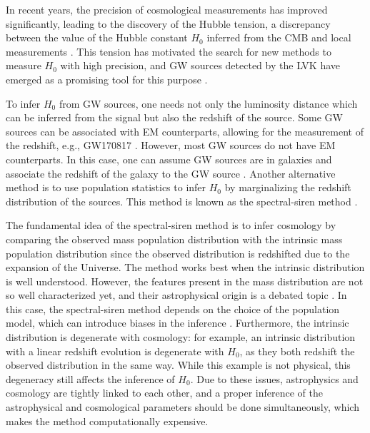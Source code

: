 \documentclass[sn-aps, pdflatex, iicol]{sn-jnl}
\begin{document}
In recent years, the precision of cosmological measurements has improved significantly, leading to the discovery of the Hubble tension, a discrepancy between the value of the Hubble constant $H_0$ inferred from the \ac{CMB} \citep{Planck:2018vyg} and local measurements \citep{Riess:2021jrx}.
This tension has motivated the search for new methods to measure $H_0$ with high precision, and \ac{GW} sources detected by the \ac{LVK} \citep{KAGRA:2013rdx, LIGOScientific:2014pky, VIRGO:2014yos, KAGRA:2020tym} have emerged as a promising tool for this purpose \citep{LIGOScientific:2017adf, LIGOScientific:2021aug, Ezquiaga:2022zkx}.

To infer $H_0$ from \ac{GW} sources, one needs not only the luminosity distance which can be inferred from the signal but also the redshift of the source.
Some \ac{GW} sources can be associated with \ac{EM} counterparts, allowing for the measurement of the redshift, e.g., GW170817 \citep{LIGOScientific:2017adf, Guidorzi:2017ogy}.
However, most \ac{GW} sources do not have \ac{EM} counterparts.
In this case, one can assume \ac{GW} sources are in galaxies and associate the redshift of the galaxy to the \ac{GW} source \citep{Schutz:1986gp, DelPozzo:2011vcw, Gray:2019ksv, Gray:2023wgj}.
Another alternative method is to use population statistics to infer $H_0$ by marginalizing the redshift distribution of the sources.
This method is known as the spectral-siren method \citep{Farr:2019twy, You:2020wju, Mastrogiovanni:2021wsd, LIGOScientific:2021aug, Ezquiaga:2022zkx}.

The fundamental idea of the spectral-siren method is to infer cosmology by comparing the observed mass population distribution with the intrinsic mass population distribution since the observed distribution is redshifted due to the expansion of the Universe.
The method works best when the intrinsic distribution is well understood.
However, the features present in the mass distribution are not so well characterized yet, and their astrophysical origin is a debated topic \citep{Zevin:2017evb, Mapelli:2020vfa, Zevin:2020gbd, Mandel:2018hfr, Marchant:2023wno}.
In this case, the spectral-siren method depends on the choice of the population model, which can introduce biases in the inference \citep{Mastrogiovanni:2021wsd, Mukherjee:2021rtw, Pierra:2023deu}.
Furthermore, the intrinsic distribution is degenerate with cosmology: for example, an intrinsic distribution with a linear redshift evolution is degenerate with $H_0$, as they both redshift the observed distribution in the same way.
While this example is not physical, this degeneracy still affects the inference of $H_0$.
Due to these issues, astrophysics and cosmology are tightly linked to each other, and a proper inference of the astrophysical and cosmological parameters should be done simultaneously, which makes the method computationally expensive.
\end{document}
